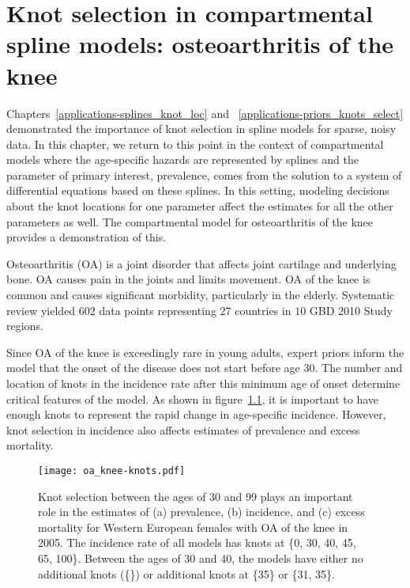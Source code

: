\chapter{Knot selection in compartmental spline models: osteoarthritis of the knee}
\label{applications-con_fit_splines}

Chapters~\ref{applications-splines_knot_loc} and
~\ref{applications-priors_knots_select} demonstrated the importance of
knot selection in spline models for sparse, noisy data. In this
chapter, we return to this point in the context of compartmental
models where the age-specific hazards are represented by splines and
the parameter of primary interest, prevalence, comes from the solution
to a system of differential equations based on these splines. In this
setting, modeling decisions about the knot locations for one parameter
affect the estimates for all the other parameters as well.  The
compartmental model for osteoarthritis of the knee provides a
demonstration of this.

Osteoarthritis (OA) is a joint disorder that affects joint cartilage and
underlying bone.  OA causes pain in the joints and limits movement.
OA of the knee is common and causes significant
morbidity, particularly in the
elderly. \cite{felson_epidemiology_1988, felson_incidence_1995}
Systematic review yielded $602$ data points representing $27$ countries
in $10$ GBD 2010 Study regions.

Since OA of the knee is exceedingly rare in young adults, expert priors inform the
model that the onset of the disease does not start before age 30.  The
number and location of knots in the incidence rate after this minimum
age of onset determine critical features of the model. As shown in
figure~\ref{fig:app-oa knee knots}, it is important to have enough
knots to represent the rapid change in age-specific incidence.
However, knot selection in incidence also affects estimates of
prevalence and excess mortality.

    \begin{figure}[h]
        \begin{center}
            \texttt{[image: oa\_knee-knots.pdf]}
            \caption[Comparison of osteoarthritis of the knee estimates 
              using a compartmental model with different knot selections.]{Knot 
              selection between the ages of 30 and 99
              plays an important role in the estimates of
              (a) prevalence, (b) incidence, and
              (c) excess mortality
              for Western European females
              with OA of the knee in 2005.  The
              incidence rate of all models has knots at \{0, 30,
              40, 45, 65, 100\}.  Between the ages
              of 30 and 40, the models have either no additional knots (\{\}) or additional knots at \{35\}
              or \{31, 35\}.}
            \label{fig:app-oa knee knots}
        \end{center}
    \end{figure}


